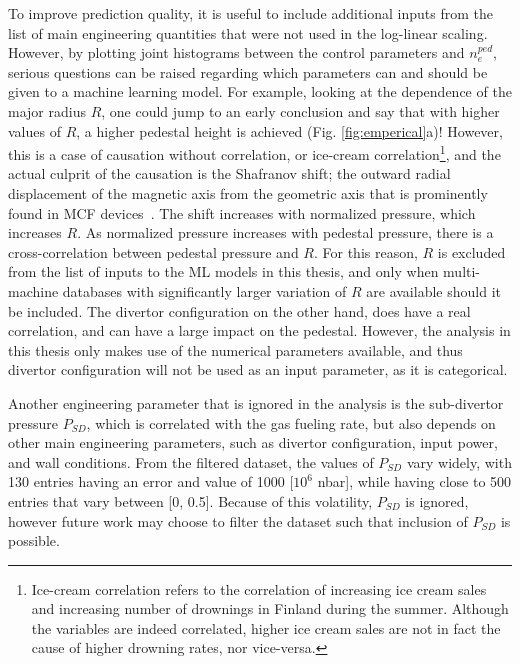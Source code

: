 \documentclass[a4paper, twoside, final, 12pt]{article}
\begin{document}
To improve prediction quality, it is useful to include additional inputs from the list of main engineering quantities that were not used in the log-linear scaling.
However, by plotting joint histograms between the control parameters and $n_e^{ped}$, serious questions can be raised regarding which parameters can and should be given to a machine learning model.
For example, looking at the dependence of the major radius $R$, one could jump to an early conclusion and say that with higher values of $R$, a higher pedestal height is achieved (Fig. \ref{fig:emperical}a)!
However, this is a case of causation without correlation, or ice-cream correlation\footnote{Ice-cream correlation refers to the correlation of increasing ice cream sales and increasing number of drownings in Finland during the summer. Although the variables are indeed correlated, higher ice cream sales are not in fact the cause of higher drowning rates, nor vice-versa.}, and the actual culprit of the causation is the Shafranov shift; the outward radial displacement of the magnetic axis from the geometric axis that is prominently found in MCF devices~\cite{shafranov_equilibrium_1963, freidberg_plasma_2007}. The shift increases with normalized pressure, which increases $R$. As normalized pressure increases with pedestal pressure, there is a cross-correlation between pedestal pressure and $R$. For this reason, $R$ is excluded from the list of inputs to the ML models in this thesis, and only when multi-machine databases with significantly larger variation of $R$ are available should it be included.
The divertor configuration on the other hand, does have a real correlation, and can have a large impact on the pedestal. However, the analysis in this thesis only makes use of the numerical parameters available, and thus divertor configuration will not be used as an input parameter, as it is categorical.  

Another engineering parameter that is ignored in the analysis is the sub-divertor pressure $P_{SD}$, which is correlated with the gas fueling rate, but also depends on other main engineering parameters, such as divertor configuration, input power, and wall conditions.
From the filtered dataset, the values of $P_{SD}$ vary widely, with 130 entries having an error and value of 1000 [$10^6$ nbar], while having close to 500 entries that vary between [0, 0.5].
Because of this volatility, $P_{SD}$ is ignored, however future work may choose to filter the dataset such that inclusion of $P_{SD}$ is possible.
\end{document}

